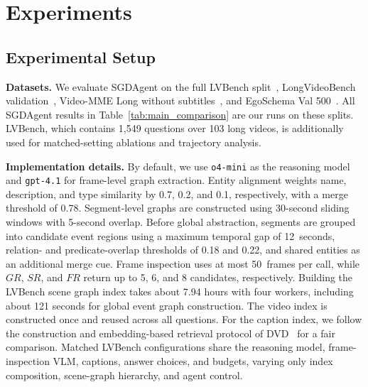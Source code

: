 \documentclass[letterpaper]{article} %
\begin{document}
\section{Experiments}
\label{sec:experiments}


\subsection{Experimental Setup}
\label{sec:setup}

\textbf{Datasets.}
We evaluate SGDAgent on the full LVBench split~\cite{lvbench}, LongVideoBench validation~\cite{longvideobench2024}, Video-MME Long without subtitles~\cite{videomme2024}, and EgoSchema Val 500~\cite{egoschema2023}.
All SGDAgent results in Table~\ref{tab:main_comparison} are our runs on these splits.
LVBench, which contains 1{,}549 questions over 103 long videos, is additionally used for matched-setting ablations and trajectory analysis.



\textbf{Implementation details.}
By default, we use \texttt{o4-mini} as the reasoning model and \texttt{gpt-4.1} for frame-level graph extraction.
Entity alignment weights name, description, and type similarity by 0.7, 0.2, and 0.1, respectively, with a merge threshold of 0.78.
Segment-level graphs are constructed using 30-second sliding windows with 5-second overlap.
Before global abstraction, segments are grouped into candidate event regions using a maximum temporal gap of 12~seconds, relation- and predicate-overlap thresholds of 0.18 and 0.22, and shared entities as an additional merge cue.
Frame inspection uses at most 50~frames per call, while $GR$, $SR$, and $FR$ return up to 5, 6, and 8 candidates, respectively.
Building the LVBench scene graph index takes about 7.94 hours with four workers, including about 121 seconds for global event graph construction.
The video index is constructed once and reused across all questions.
For the caption index, we follow the construction and embedding-based retrieval protocol of DVD~\cite{deepvideo2025} for a fair comparison.
Matched LVBench configurations share the reasoning model, frame-inspection VLM, captions, answer choices, and budgets, varying only index composition, scene-graph hierarchy, and agent control.
\end{document}
